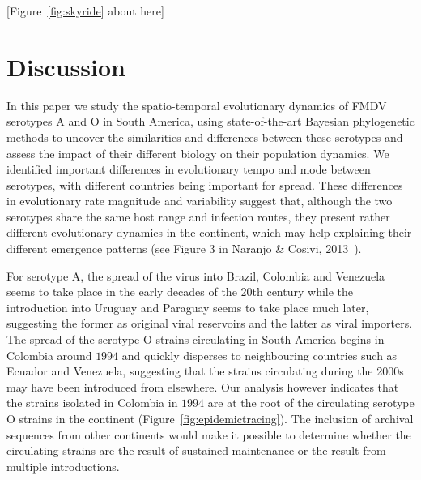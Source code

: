 \documentclass[10pt]{article}
\begin{document}
\begin{center}
 [Figure~\ref{fig:skyride} about here]
\end{center}


\section*{Discussion}

In this paper we study the spatio-temporal evolutionary dynamics of FMDV serotypes A and O in South America, using state-of-the-art Bayesian phylogenetic methods to uncover the similarities and differences between these serotypes and assess the impact of their different biology on their population dynamics.
We identified important differences in evolutionary tempo and mode between serotypes, with different countries being important for spread.
These differences in evolutionary rate magnitude and variability suggest that, although the two serotypes share the same host range and infection routes, they present rather different evolutionary dynamics in the continent, which may help explaining their different emergence patterns (see Figure 3 in Naranjo \& Cosivi, 2013~\cite{Naranjo2013}). 

For serotype A, the spread of the virus into  Brazil, Colombia and Venezuela seems to take place in the early decades of the 20th century while the introduction into Uruguay and Paraguay seems to take place much later, suggesting the former as original viral reservoirs and the latter as viral importers.
The spread of the serotype O strains  circulating in South America begins in Colombia around $1994$ and quickly disperses to neighbouring countries such as Ecuador and Venezuela, suggesting that the strains circulating during the 2000s may have been introduced from elsewhere.
Our analysis however indicates that the strains isolated in Colombia in $1994$ are at the root of the circulating serotype O strains in the continent (Figure~\ref{fig:epidemictracing}).
The inclusion of archival sequences from other continents would make it possible to determine whether the circulating strains are the result of sustained maintenance or the result from multiple introductions. 
\end{document}
